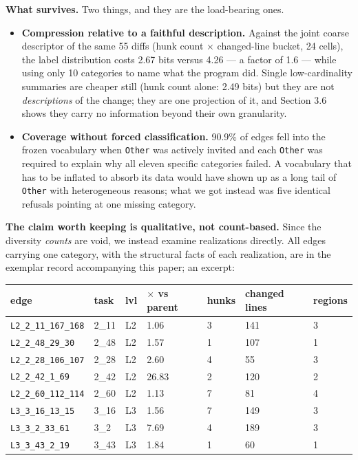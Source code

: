 \documentclass[
  11pt,
]{article}
\providecommand{\tightlist}{%
  \setlength{\itemsep}{0pt}\setlength{\parskip}{0pt}}
\begin{document}
\textbf{What survives.} Two things, and they are the load-bearing ones.

\begin{itemize}
\tightlist
\item
  \textbf{Compression relative to a faithful description.} Against the joint coarse descriptor of the same 55 diffs (hunk count \(\times\) changed-line bucket, 24 cells), the label distribution costs 2.67 bits versus 4.26 --- a factor of 1.6 --- while using only 10 categories to name what the program did. Single low-cardinality summaries are cheaper still (hunk count alone: 2.49 bits) but they are not \emph{descriptions} of the change; they are one projection of it, and Section 3.6 shows they carry no information beyond their own granularity.
\item
  \textbf{Coverage without forced classification.} 90.9\% of edges fell into the frozen vocabulary when \texttt{Other} was actively invited and each \texttt{Other} was required to explain why all eleven specific categories failed. A vocabulary that has to be inflated to absorb its data would have shown up as a long tail of \texttt{Other} with heterogeneous reasons; what we got instead was five identical refusals pointing at one missing category.
\end{itemize}

\textbf{The claim worth keeping is qualitative, not count-based.} Since the diversity \emph{counts} are void, we instead examine realizations directly. All edges carrying one category, with the structural facts of each realization, are in the exemplar record accompanying this paper; an excerpt:

\begin{longtable}[]{@{}lllllll@{}}
\toprule
edge & task & lvl & \(\times\) vs parent & hunks & changed lines & regions \\
\midrule
\endhead
\texttt{L2\_2\_11\_167\_168} & 2\_11 & L2 & 1.06 & 3 & 141 & 3 \\
\texttt{L2\_2\_48\_29\_30} & 2\_48 & L2 & 1.57 & 1 & 107 & 1 \\
\texttt{L2\_2\_28\_106\_107} & 2\_28 & L2 & 2.60 & 4 & 55 & 3 \\
\texttt{L2\_2\_42\_1\_69} & 2\_42 & L2 & 26.83 & 2 & 120 & 2 \\
\texttt{L2\_2\_60\_112\_114} & 2\_60 & L2 & 1.13 & 7 & 81 & 4 \\
\texttt{L3\_3\_16\_13\_15} & 3\_16 & L3 & 1.56 & 7 & 149 & 3 \\
\texttt{L3\_3\_2\_33\_61} & 3\_2 & L3 & 7.69 & 4 & 189 & 3 \\
\texttt{L3\_3\_43\_2\_19} & 3\_43 & L3 & 1.84 & 1 & 60 & 1 \\
\bottomrule
\end{longtable}
\end{document}
